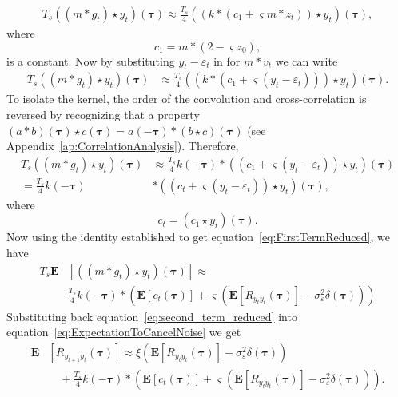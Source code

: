 \documentclass[10pt,twocolumn,twoside]{IEEEtran}
\begin{document}
\begin{align}	
	T_s((m \ast g_t) \star y_t)(\boldsymbol\tau) \approx \frac{T_s}{4}((k\ast (c_1 + \varsigma m \ast z_t)) \star y_t)(\boldsymbol\tau), 
\end{align}
where
\begin{equation}
	c_1 = m\ast (2 - \varsigma z_0),
\end{equation}
is a constant. Now by substituting $y_t - \varepsilon_t$ in for $m\ast v_t$ we can write
\begin{align}
	T_s((m \ast g_t) \star y_t)(\boldsymbol\tau) &\approx \frac{T_s}{4}((k\ast (c_1 + \varsigma (y_t - \varepsilon_t))) \star y_t) (\boldsymbol\tau).
\end{align}
To isolate the kernel, the order of the convolution and cross-correlation is reversed by recognizing that a property $(a \ast b)(\boldsymbol\tau) \star c(\boldsymbol\tau) = a(-\boldsymbol\tau)\ast(b \star c)(\boldsymbol\tau)$ (see Appendix~\ref{ap:CorrelationAnalysis}). Therefore,
\begin{align}
	T_s((m \ast g_t) \star y_t)(\boldsymbol\tau) &\approx \frac{T_s}{4} k(-\boldsymbol\tau) \ast ((c_1 + \varsigma (y_t - \varepsilon_t)) \star y_t)(\boldsymbol\tau) \nonumber\\
	= \frac{T_s}{4}k(-\boldsymbol\tau) & \ast (( c_t + \varsigma (y_t - \varepsilon_t)) \star y_t) (\boldsymbol\tau),
\end{align}
where
\begin{equation}
	c_t = (c_1\star y_t)(\boldsymbol\tau).
\end{equation}  
Now using the identity established to get equation~\eqref{eq:FirstTermReduced}, we have
\begin{align}\label{eq:second_term_reduced}
	T_s\mathbf{E}&\left[((m \ast g_t) \star y_t)(\boldsymbol\tau)\right] \approx \nonumber \\
	&\frac{T_s}{4} k(-\boldsymbol\tau) \ast (\mathbf{E}\left[c_t(\boldsymbol\tau)\right] + \varsigma (\mathbf{E}\left[R_{y_ty_t}(\boldsymbol\tau)\right] - \sigma_{\varepsilon}^2 \delta(\boldsymbol\tau)))
\end{align}
Substituting back equation~\eqref{eq:second_term_reduced} into equation~\eqref{eq:ExpectationToCancelNoise} we get
\begin{align}\label{eq:SimplifiedXcorr}
	\mathbf{E}&[R_{y_{t+1}y_t}(\boldsymbol{\tau})] \approx \xi\left(\mathbf{E}[ R_{y_ty_t}(\boldsymbol{\tau})] - \sigma_{\varepsilon}^2 \delta(\boldsymbol{\tau})\right) \nonumber \\
	&\quad+ \frac{T_s}{4} k(-\boldsymbol\tau) \ast (\mathbf{E}\left[c_t(\boldsymbol\tau)\right] + \varsigma (\mathbf{E}\left[R_{y_ty_t}(\boldsymbol\tau)\right] - \sigma_{\varepsilon}^2 \delta(\boldsymbol\tau))).
\end{align}
\end{document}
